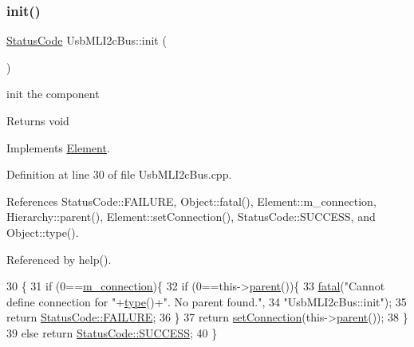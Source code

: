 \subsubsection{\texorpdfstring{init()}{init()}}
{\footnotesize\ttfamily \hyperlink{classStatusCode}{Status\+Code} Usb\+M\+L\+I2c\+Bus\+::init (\begin{DoxyParamCaption}{ }\end{DoxyParamCaption})\hspace{0.3cm}{\ttfamily [virtual]}}

init the component

\begin{DoxyReturn}{Returns}
void 
\end{DoxyReturn}


Implements \hyperlink{classElement_af42754b5cabc198869222725218d695c}{Element}.



Definition at line 30 of file Usb\+M\+L\+I2c\+Bus.\+cpp.



References Status\+Code\+::\+F\+A\+I\+L\+U\+RE, Object\+::fatal(), Element\+::m\+\_\+connection, Hierarchy\+::parent(), Element\+::set\+Connection(), Status\+Code\+::\+S\+U\+C\+C\+E\+SS, and Object\+::type().



Referenced by help().


\begin{DoxyCode}
30                              \{
31   \textcolor{keywordflow}{if} (0==\hyperlink{classElement_abe3de7a5dbbc9a6dd2d7e012e5fdb266}{m\_connection})\{
32     \textcolor{keywordflow}{if} (0==this->\hyperlink{classHierarchy_a1c7bec8257e717f9c1465e06ebf845fc}{parent}())\{
33       \hyperlink{classObject_aad5a16aac7516ce65bd5ec02ab07fc80}{fatal}(\textcolor{stringliteral}{"Cannot define connection for "}+\hyperlink{classObject_a84f99f70f144a83e1582d1d0f84e4e62}{type}()+\textcolor{stringliteral}{". No parent found."},
34           \textcolor{stringliteral}{"UsbMLI2cBus::init"});
35         \textcolor{keywordflow}{return} \hyperlink{classStatusCode_a6f565cbeadc76d14c72f047e5e85eb4ba3da73d4c469762eb9d3c960368252b26}{StatusCode::FAILURE};
36     \}
37     \textcolor{keywordflow}{return} \hyperlink{classElement_ab476b4b1df5954141ceb14f072433b89}{setConnection}(this->\hyperlink{classHierarchy_a1c7bec8257e717f9c1465e06ebf845fc}{parent}());
38   \}
39   \textcolor{keywordflow}{else} \textcolor{keywordflow}{return} \hyperlink{classStatusCode_a6f565cbeadc76d14c72f047e5e85eb4badd0da38d3ba0d922efd1f4619bc37ad8}{StatusCode::SUCCESS};
40 \}
\end{DoxyCode}
\mbox{\label{classUsbMLI2cBus_a70751407b58ccf17db3940daeeb9bb19}} 
